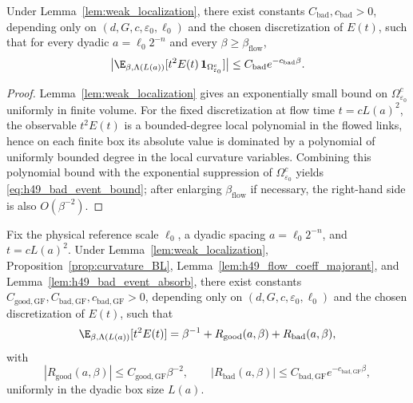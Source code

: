 \begin{lemma}\label{lem:h49_bad_event_absorb}
Under Lemma~\ref{lem:weak_localization}, there exist constants $C_{\mathrm{bad}},c_{\mathrm{bad}}>0$, depending only on $(d,G,c,\varepsilon_0,\ell_0)$ and the chosen discretization of $E(t)$, such that for every dyadic $a=\ell_0 2^{-n}$ and every $\beta\ge\beta_{\mathrm{flow}}$,
\begin{equation}\label{eq:h49_bad_event_bound}
\big|\E_{\beta,\Lambda(L(a))}[t^2E(t)\,\mathbf 1_{\Omega_{\varepsilon_0}^c}]\big|
\le
C_{\mathrm{bad}}e^{-c_{\mathrm{bad}}\beta}.
\end{equation}
\end{lemma}

\begin{proof}
Lemma~\ref{lem:weak_localization} gives an exponentially small bound on $\Omega_{\varepsilon_0}^c$ uniformly in finite volume.
For the fixed discretization at flow time $t=cL(a)^2$, the observable $t^2E(t)$ is a bounded-degree local polynomial in the flowed links, hence on each finite box its absolute value is dominated by a polynomial of uniformly bounded degree in the local curvature variables.
Combining this polynomial bound with the exponential suppression of $\Omega_{\varepsilon_0}^c$ yields \eqref{eq:h49_bad_event_bound}; after enlarging $\beta_{\mathrm{flow}}$ if necessary, the right-hand side is also $O(\beta^{-2})$.
\end{proof}


\begin{proposition}\label{prop:h49_quantitative_decomposition}
Fix the physical reference scale $\ell_0$, a dyadic spacing $a=\ell_0 2^{-n}$, and $t=cL(a)^2$.
Under Lemma~\ref{lem:weak_localization}, Proposition~\ref{prop:curvature_BL}, Lemma~\ref{lem:h49_flow_coeff_majorant}, and Lemma~\ref{lem:h49_bad_event_absorb}, there exist constants $C_{\mathrm{good,GF}},C_{\mathrm{bad,GF}},c_{\mathrm{bad,GF}}>0$, depending only on $(d,G,c,\varepsilon_0,\ell_0)$ and the chosen discretization of $E(t)$, such that
\begin{equation}\label{eq:h49_quantitative_split}
\E_{\beta,\Lambda(L(a))}[t^2E(t)]
=
\beta^{-1}+R_{\mathrm{good}}(a,\beta)+R_{\mathrm{bad}}(a,\beta),
\end{equation}
with
\begin{equation}\label{eq:h49_quantitative_remainders}
|R_{\mathrm{good}}(a,\beta)|\le C_{\mathrm{good,GF}}\beta^{-2},
\qquad
|R_{\mathrm{bad}}(a,\beta)|\le C_{\mathrm{bad,GF}}e^{-c_{\mathrm{bad,GF}}\beta},
\end{equation}
uniformly in the dyadic box size $L(a)$.
\end{proposition}

